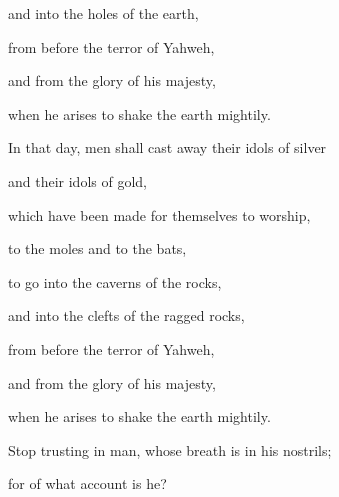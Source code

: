 {\par }{\QB and into the holes of the earth,
\par }{\QB from before the terror of Yahweh,
\par }{\QB and from the glory of his majesty,
\par }{\QB when he arises to shake the earth mightily.
\par }{\Q {}In that day, men shall cast away their idols of silver
\par }{\QB and their idols of gold,
\par }{\QB which have been made for themselves to worship,
\par }{\QB to the moles and to the bats,
\par }{\QB {}to go into the caverns of the rocks,
\par }{\QB and into the clefts of the ragged rocks,
\par }{\QB from before the terror of Yahweh,
\par }{\QB and from the glory of his majesty,
\par }{\QB when he arises to shake the earth mightily.
\par }{\Q {}Stop trusting in man, whose breath is in his nostrils;
\par }{\QB for of what account is he?

}
